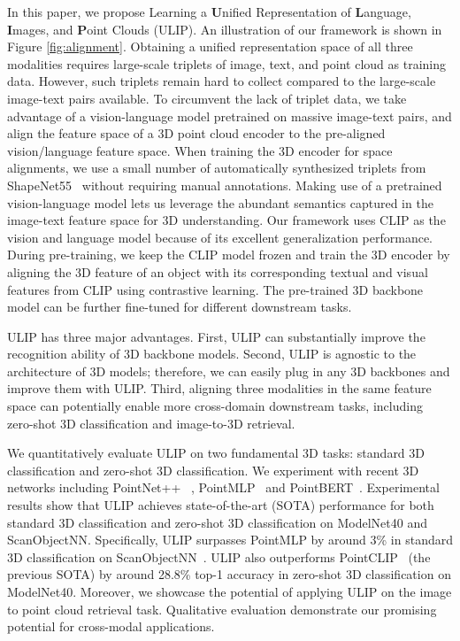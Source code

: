 In this paper, we propose Learning a \textbf{U}nified Representation of \textbf{L}anguage, \textbf{I}mages, and \textbf{P}oint Clouds (ULIP). 
An illustration of our framework is shown in Figure \ref{fig:alignment}. 
Obtaining a unified representation space of all three modalities requires large-scale triplets of image, text, and point cloud as training data.
However, such triplets remain hard to collect compared to the large-scale image-text pairs available.
To circumvent the lack of triplet data, we take advantage of a vision-language model pretrained on massive image-text pairs, and align the feature space of a 3D point cloud encoder to the pre-aligned vision/language feature space. 
When training the 3D encoder for space alignments, we use a small number of automatically synthesized triplets from ShapeNet55~\cite{chang2015shapenet} without requiring manual annotations.
Making use of a pretrained vision-language model lets us leverage the abundant semantics captured in the image-text feature space for 3D understanding.
Our framework uses CLIP as the vision and language model because of its excellent generalization performance. During pre-training, we keep the CLIP model frozen and train the 3D encoder by aligning the 3D feature of an object with its corresponding textual and visual features from CLIP using contrastive learning.
The pre-trained 3D backbone model can be further fine-tuned for different downstream tasks.

ULIP has three major advantages. First, ULIP can substantially improve the recognition ability of 3D backbone models. Second, ULIP is agnostic to the architecture of 3D models; therefore, we can easily plug in any 3D backbones and improve them with ULIP. Third, aligning three modalities in the same feature space can potentially enable more cross-domain downstream tasks, including zero-shot 3D classification and image-to-3D retrieval.

We quantitatively evaluate ULIP on two fundamental 3D tasks: standard 3D classification and zero-shot 3D classification. We experiment with recent 3D networks including PointNet++ ~\cite{qi2017pointnet++}, PointMLP~\cite{ma2022rethinking} and PointBERT~\cite{yu2022point}. 
Experimental results show that ULIP achieves state-of-the-art (SOTA) performance for both standard 3D classification and zero-shot 3D classification on ModelNet40 and ScanObjectNN. Specifically, ULIP surpasses PointMLP by around 3\% in standard 3D classification on ScanObjectNN~\cite{Uy_2019_ICCV}. ULIP also outperforms PointCLIP~\cite{zhang2022pointclip} (the previous SOTA) by around 28.8\% top-1 accuracy in zero-shot 3D classification on ModelNet40. Moreover, we showcase the potential of applying ULIP on the image to point cloud retrieval task. %
Qualitative evaluation demonstrate our promising potential for cross-modal applications.

